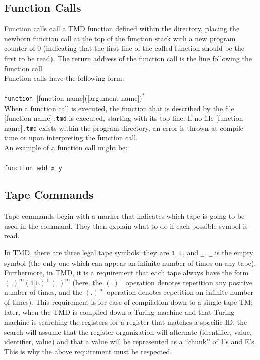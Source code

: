 \documentclass[11pt]{article}
\begin{document}
\subsection{Function Calls}

Function calls call a TMD function defined within the directory, placing the newborn function call at the top of the function stack with a new program counter of 0 (indicating that the first line of the called function should be the first to be read). The return address of the function call is the line following the function call. \\

Function calls have the following form: \\ \\
\texttt{function }[function name]([argument name]$)^*$ \\

When a function call is executed, the function that is described by the file [function name]\texttt{.tmd} is executed, starting with its top line. If no file [function name]\texttt{.tmd} exists within the program directory, an error is thrown at compile-time or upon interpreting the function call. \\ 

An example of a function call might be: \\ \\
\texttt{function add x y}

\subsection{Tape Commands}

Tape commands begin with a marker that indicates which tape is going to be used in the command. They then explain what to do if each possible symbol is read.

In TMD, there are three legal tape symbols; they are \texttt{1}, \texttt{E}, and \texttt{\_}. \texttt{\_} is the empty symbol (the only one which can appear an infinite number of times on any tape). Furthermore, in TMD, it is a requirement that each tape always have the form $(\texttt{\_})^{\infty}(\texttt{1}|\texttt{E})^{+}(\texttt{\_})^{\infty}$ (here, the $(.)^+$ operation denotes repetition any positive number of times, and the $(.)^\infty$ operation denotes repetition an infinite number of times). This requirement is for ease of compilation down to a single-tape TM; later, when the TMD is compiled down a Turing machine and that Turing machine is searching the registers for a register that matches a specific ID, the search will assume that the register organization will alternate (identifier, value, identifier, value) and that a value will be represented as a ``chunk'' of 1's and E's. This is why the above requirement must be respected. \\
\end{document}
